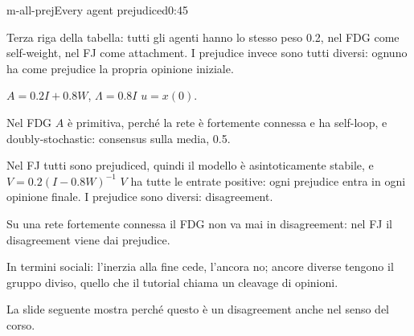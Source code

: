 \begin{slide}{m-all-prej}{Every agent prejudiced}{0:45}
  \begin{discorso}
    \item {\color{blue}Terza riga della tabella: tutti gli agenti hanno lo stesso peso 0.2, nel FDG come self-weight, nel FJ come attachment. I prejudice invece sono tutti diversi: ognuno ha come prejudice la propria opinione iniziale.}
    \item {\color{red}                 } {\color{red}$A=0.2I+0.8W$,} {\color{red}    } {\color{red}$\Lambda=0.8I$} {\color{red}} {\color{red}$u=x(0)$.}
    \item Nel FDG {\color{red} } {\color{blue}$A$} è primitiva, {\color{red}   } {\color{blue}perché la rete è fortemente connessa e ha self-loop,} e doubly-stochastic: {\color{red}} {\color{blue}consensus} sulla media, 0.5.
    \item Nel FJ tutti {\color{red} } sono prejudiced, quindi il modello è asintoticamente stabile, e {\color{red}$V=0.2(I-0.8W)^{-1}$} {\color{blue}$V$} ha tutte le entrate {\color{red}} {\color{blue}positive: ogni prejudice entra in ogni opinione finale.} I {\color{red}} {\color{blue}prejudice} sono {\color{red}  } {\color{blue}diversi: disagreement.}
    \item Su una rete fortemente connessa il FDG non va mai in {\color{red}} {\color{blue}disagreement:} nel FJ il {\color{red}} {\color{blue}disagreement} viene dai {\color{red}} {\color{blue}prejudice.}
    \item In termini sociali: l'inerzia alla fine cede, l'ancora no; ancore diverse tengono il gruppo diviso, quello che il tutorial chiama un cleavage di opinioni.
    \item La slide seguente mostra perché questo è un {\color{red}} {\color{blue}disagreement} anche nel senso del corso.
  \end{discorso}
\end{slide}

